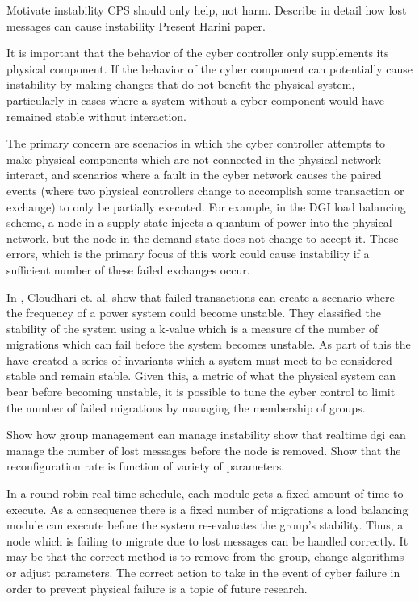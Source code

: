 Motivate instability
    CPS should only help, not harm.
    Describe in detail how lost messages can cause    instability
    Present Harini paper.

It is important that the behavior of the cyber controller only supplements its physical component. If the behavior of the cyber component can potentially cause instability by making changes that do not benefit the physical system, particularly in cases where a system without a cyber component would have remained stable without interaction.

The primary concern are scenarios in which the cyber controller attempts to make physical components which are not connected in the physical network interact, and scenarios where a fault in the cyber network causes the paired events (where two physical controllers change to accomplish some transaction or exchange) to only be partially executed. For example, in the DGI load balancing scheme, a node in a supply state injects a quantum of power into the physical network, but the node in the demand state does not change to accept it. These errors, which is the primary focus of this work could cause instability if a sufficient number of these failed exchanges occur.

In \cite{HARINI}, Cloudhari et. al. show that failed transactions can create a scenario where the frequency of a power system could become unstable. They classified the stability of the system using a k-value which is a measure of the number of migrations which can fail before the system becomes unstable. As part of this the have created a series of invariants which a system must meet to be considered stable and remain stable. Given this, a metric of what the physical system can bear before becoming unstable, it is possible to tune the cyber control to limit the number of failed migrations by managing the membership of groups.

Show how group management can manage instability
    show that realtime dgi can manage the number of lost messages before the node is removed.
    Show that the reconfiguration rate is function of variety of parameters.

In a round-robin real-time schedule, each module gets a fixed amount of time to execute. As a consequence there is a fixed number of migrations a load balancing module can execute before the system re-evaluates the group's stability. Thus, a node which is failing to migrate due to lost messages can be handled correctly. It may be that the correct method is to remove from the group, change algorithms or adjust parameters. The correct action to take in the event of cyber failure in order to prevent physical failure is a topic of future research.


